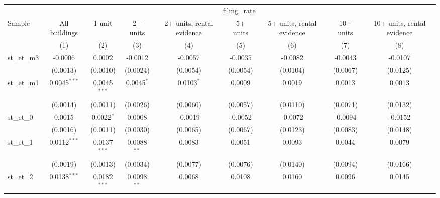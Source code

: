 
\begingroup
\centering
\begin{tabular}{lcccccccc}
   \toprule
    & \multicolumn{8}{c}{filing\_rate}\\
   Sample                     & All buildings         & 1-unit         & 2+ units              & 2+ units, rental evidence & 5+ units      & 5+ units, rental evidence & 10+ units     & 10+ units, rental evidence \\   
                              & (1)                   & (2)            & (3)                   & (4)                       & (5)           & (6)                       & (7)           & (8)\\  
   \midrule 
   st\_et\_m3                 & -0.0006               & 0.0002         & -0.0012               & -0.0057                   & -0.0035       & -0.0082                   & -0.0043       & -0.0107\\   
                              & (0.0013)              & (0.0010)       & (0.0024)              & (0.0054)                  & (0.0054)      & (0.0104)                  & (0.0067)      & (0.0125)\\   
   st\_et\_m1                 & 0.0045$^{***}$        & 0.0045$^{***}$ & 0.0045$^{*}$          & 0.0103$^{*}$              & 0.0009        & 0.0019                    & 0.0013        & 0.0013\\   
                              & (0.0014)              & (0.0011)       & (0.0026)              & (0.0060)                  & (0.0057)      & (0.0110)                  & (0.0071)      & (0.0132)\\   
   st\_et\_0                  & 0.0015                & 0.0022$^{*}$   & 0.0008                & -0.0019                   & -0.0052       & -0.0072                   & -0.0094       & -0.0152\\   
                              & (0.0016)              & (0.0011)       & (0.0030)              & (0.0065)                  & (0.0067)      & (0.0123)                  & (0.0083)      & (0.0148)\\   
   st\_et\_1                  & 0.0112$^{***}$        & 0.0137$^{***}$ & 0.0088$^{**}$         & 0.0083                    & 0.0051        & 0.0093                    & 0.0044        & 0.0079\\   
                              & (0.0019)              & (0.0013)       & (0.0034)              & (0.0077)                  & (0.0076)      & (0.0140)                  & (0.0094)      & (0.0166)\\   
   st\_et\_2                  & 0.0138$^{***}$        & 0.0182$^{***}$ & 0.0098$^{**}$         & 0.0068                    & 0.0108        & 0.0160                    & 0.0096        & 0.0145\\   

\end{tabular}
